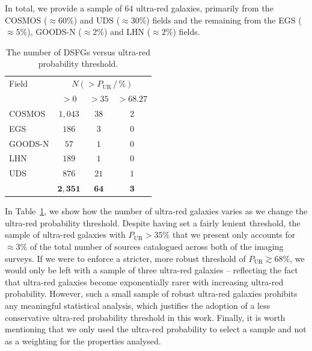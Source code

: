 \documentclass[a4paper, fleqn, usenatbib]{mnras}
\newcommand{\pur}{P_{\text{UR}}}
\newcommand{\urgs}{ultra-red galaxies}
\begin{document}
In total, we provide a sample of $64$ \urgs{}, primarily from the COSMOS ($\approx60\%$) and UDS ($\approx30\%$) fields and the remaining from the EGS ($\approx5\%$), GOODS-N ($\approx2\%$) and LHN ($\approx2\%$) fields.

\begin{table}
    \centering
    \caption{The number of DSFGs versus ultra-red probability threshold.}
    \label{tab:number_of_ur}
    \begin{tabular}{lccc}
        \hline
        Field & \multicolumn{3}{c}{\dotfill\,$N(>\pur{}\,/\,\%)$\,\dotfill} \\
        & $>0$ & $>35$ & $>68.27$\\
        \hline
        COSMOS & $1{,}043$ & $38$ & $2$\\
        EGS & $186$ & $3$ & $0$\\
        GOODS-N & $57$ & $1$ & $0$\\
        LHN & $189$ & $1$ & $0$\\
        UDS & $876$ & $21$ & $1$\\\cmidrule[0.5pt]{2-4}
        & $\boldsymbol{2{,}351}$ & $\boldsymbol{64}$ & $\boldsymbol{3}$\\
        \hline
    \end{tabular}
\end{table}

In Table~\ref{tab:number_of_ur}, we show how the number of \urgs{} varies as we change the ultra-red probability threshold.
Despite having set a fairly lenient threshold, the sample of \urgs{} with $\pur{}>35\%$ that we present only accounts for $\approx3\%$ of the total number of sources catalogued across both of the imaging surveys.
If we were to enforce a stricter, more robust threshold of $\pur{}\gtrsim68\%$, we would only be left with a sample of three \urgs{} -- reflecting the fact that \urgs{} become exponentially rarer with increasing ultra-red probability.
However, such a small sample of robust \urgs{} prohibits any meaningful statistical analysis, which justifies the adoption of a less conservative ultra-red probability threshold in this work.
Finally, it is worth mentioning that we only used the ultra-red probability to select a sample and not as a weighting for the properties analysed.
\end{document}
